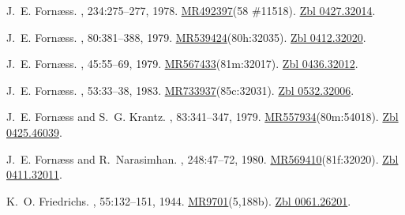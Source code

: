 \documentclass[11pt,a4paper, final, twoside]{article}
\numberwithin{equation}{section}
\begin{document}
\begin{appendices}
\begin{thebibliography}{100}
J.~E. Forn{\ae}ss.
, 234:275--277, 1978.
\newblock \href{http://www.ams.org/mathscinet-getitem?mr=492397}{MR492397}(58
  \#11518). \href{http://zbmath.org/?q=an:0427.32014}{Zbl 0427.32014}.

J.~E. Forn{\ae}ss.
, 80:381--388, 1979.
\newblock
  \href{http://www.ams.org/mathscinet-getitem?mr=539424}{MR539424}(80h:32035).
  \href{http://zbmath.org/?q=an:0412.32020}{Zbl 0412.32020}.

J.~E. Forn{\ae}ss.
, 45:55--69, 1979.
\newblock
  \href{http://www.ams.org/mathscinet-getitem?mr=567433}{MR567433}(81m:32017).
  \href{http://zbmath.org/?q=an:0436.32012}{Zbl 0436.32012}.

J.~E. Forn{\ae}ss.
, 53:33--38, 1983.
\newblock
  \href{http://www.ams.org/mathscinet-getitem?mr=733937}{MR733937}(85c:32031).
  \href{http://zbmath.org/?q=an:0532.32006}{Zbl 0532.32006}.

J.~E. Forn{\ae}ss and S.~G. Krantz.
, 83:341--347, 1979.
\newblock
  \href{http://www.ams.org/mathscinet-getitem?mr=557934}{MR557934}(80m:54018).
  \href{http://zbmath.org/?q=an:0425.46039}{Zbl 0425.46039}.

J.~E. Forn{\ae}ss and R.~Narasimhan.
, 248:47--72, 1980.
\newblock
  \href{http://www.ams.org/mathscinet-getitem?mr=569410}{MR569410}(81f:32020).
  \href{http://zbmath.org/?q=an:0411.32011}{Zbl 0411.32011}.

K.~O. Friedrichs.
,
  55:132--151, 1944.
\newblock \href{http://www.ams.org/mathscinet-getitem?mr=9701}{MR9701}(5,188b).
  \href{http://zbmath.org/?q=an:0061.26201}{Zbl 0061.26201}.


\end{thebibliography}
\end{appendices}
\end{document}
